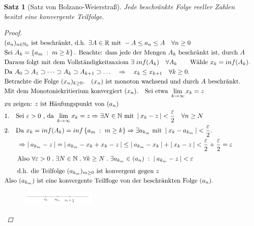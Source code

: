 \documentclass[a4paper,titlepage,oneside]{article}
\def\N{\ensuremath{\mathbb{N}} }
\def\R{\ensuremath{\mathbb{R}} }
\renewcommand{\epsilon}{\ensuremath{\varepsilon} }
\def\zz{\text{zu zeigen: }}
\def\sp{\hspace{0,1cm}}
\def\spdot{\sp.\sp}
\def\spcolon{\sp:\sp}
\renewcommand{\liminf}[2][n]{\ensuremath{\lim\limits_{#1 \rightarrow \infty}{#2}}}
\newcommand{\abs}[1]{\ensuremath{\left|\:#1\:\right|}}
\newcommand{\menge}[2]{\ensuremath{\left\{#1\sp : \sp #2\right\}}}
\theoremstyle{thmstyle}
\newtheorem{satz}{Satz}[section]
\theoremstyle{subthmstyle}
\begin{document}
\begin{satz}[Satz von Bolzano-Weierstraß]
Jede beschränkte Folge reeller Zahlen besitzt eine konvergente Teilfolge.
\begin{proof}
\begin{math} \displaystyle
\begin{aligned}[t]
&(a_n)_{n \in \N_0} \text{ ist beschränkt, d.h. }\exists A \in \R \text{ mit }-A \le a_n \le A \quad \forall n \ge 0\\
&\text{Sei } A_k = \menge{a_m}{m \ge k} \text{. Beachte: dass jede der Mengen } A_k \text{ beschränkt ist, durch }A\\
&\text{Daraus folgt mit dem Vollständigkeitsaxiom } \exists \sp inf(A_k) \quad \forall A_k \qquad \text{Wähle } x_k = inf(A_k). \\
&\text{Da } A_0 \supset A_1 \supset \dots \supset A_k \supset A_{k+1} \supset \dots \quad \Rightarrow \quad x_k \le x_{k+1} \quad \forall k \ge 0.\\
&\text{Betrachte die Folge }(x_n)_{k \ge 0}. \quad (x_n) \text{ ist monoton wachsend und durch $A$ beschränkt.}\\
&\text{Mit dem Monotoniekritierium konvergiert } (x_n). \quad \text{Sei etwa } \liminf[k]{x_k} = z\\
&\zz z \text{ ist Häufungspunkt von } (a_n) \\
&\begin{aligned}[t]
& 1. &&\text{Sei } \epsilon > 0 \text{ , da } \liminf[k]{x_k} = z \Rightarrow \exists N \in \N \text{ mit } \abs{x_k - z} < \frac{\epsilon}{2} \quad \forall n \ge N \\
& 2. &&\text{Da }x_k = inf(A_k) = inf\menge{a_m}{m \ge k} \Rightarrow \exists a_{k_m} \text{ mit } \abs{x_k - a_{k_m}} < \frac{\epsilon}{2}.
\end{aligned} \\ \vphantom{\frac{\epsilon}{2}}
&\qquad \Rightarrow \abs{a_{k_m} - z} = \abs{a_{k_m} - x_k + x_k - z} \le \abs{a_{k_m} - x_k} + \abs{x_k - z} < \frac{\epsilon}{2} + \frac{\epsilon}{2} = \epsilon  \\ \vphantom{\frac{\epsilon}{2}}
&\qquad \text{Also } \forall \epsilon > 0 \spdot \exists N \in \N \spdot \forall k \ge N \spdot \exists a_{k_m} \in (a_n) \spcolon \abs{a_{k_m} - z} < \epsilon  \\
&\qquad \text{d.h. die Teilfolge }(a_{k_m})_{m\ge 0}\text{ ist konvergent gegen } z \\
&\text{Also }(a_{k_m})\text{ ist eine konvergente Teilfloge von der beschränkten Folge }(a_n).
\end{aligned} \\
\end{math}
\begin{figure}[ht]\centering
 \includegraphics[width=0.33\textwidth]{images/zahlenstrahl_bolzanoWS.png}
\end{figure}
\end{proof}
\end{satz}
\end{document}
